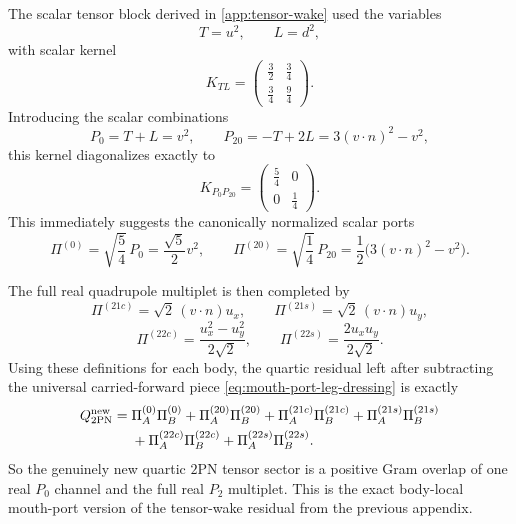 \documentclass[11pt]{article}
\newcommand{\TwoPN}{\mathrm{2PN}}
\begin{document}
The scalar tensor block derived in \cref{app:tensor-wake} used the variables
\begin{equation}
T=u^2,
\qquad
L=d^2,
\label{eq:mouth-port-TL}
\end{equation}
with scalar kernel
\begin{equation}
K_{TL}=
\begin{pmatrix}
\frac32 & \frac34\\[3pt]
\frac34 & \frac94
\end{pmatrix}.
\label{eq:mouth-port-KTL}
\end{equation}
Introducing the scalar combinations
\begin{equation}
P_0=T+L=v^2,
\qquad
P_{20}=-T+2L=3(v\!\cdot\!n)^2-v^2,
\label{eq:mouth-port-P0P20}
\end{equation}
this kernel diagonalizes exactly to
\begin{equation}
K_{P_0P_{20}}=
\begin{pmatrix}
\frac54 & 0\\[3pt]
0 & \frac14
\end{pmatrix}.
\label{eq:mouth-port-Kdiag}
\end{equation}
This immediately suggests the canonically normalized scalar ports
\begin{equation}
\Pi^{(0)}=\sqrt{\frac54}\,P_0=\frac{\sqrt5}{2}v^2,
\qquad
\Pi^{(20)}=\sqrt{\frac14}\,P_{20}=\frac12\bigl(3(v\!\cdot\!n)^2-v^2\bigr).
\label{eq:mouth-port-scalar-ports}
\end{equation}

The full real quadrupole multiplet is then completed by
\begin{equation}
\Pi^{(21c)}=\sqrt2\,(v\!\cdot\!n)u_x,
\qquad
\Pi^{(21s)}=\sqrt2\,(v\!\cdot\!n)u_y,
\label{eq:mouth-port-21-ports}
\end{equation}
\begin{equation}
\Pi^{(22c)}=\frac{u_x^2-u_y^2}{2\sqrt2},
\qquad
\Pi^{(22s)}=\frac{2u_xu_y}{2\sqrt2}.
\label{eq:mouth-port-22-ports}
\end{equation}
Using these definitions for each body, the quartic residual left after subtracting the
universal carried-forward piece \cref{eq:mouth-port-leg-dressing} is exactly
\begin{align}
Q^{\rm new}_{2\mathrm{PN}}
={}&
\Pi_A^{(0)}\Pi_B^{(0)}
+\Pi_A^{(20)}\Pi_B^{(20)}
+\Pi_A^{(21c)}\Pi_B^{(21c)}
+\Pi_A^{(21s)}\Pi_B^{(21s)}
\notag\\
&
+\Pi_A^{(22c)}\Pi_B^{(22c)}
+\Pi_A^{(22s)}\Pi_B^{(22s)}.
\label{eq:mouth-port-quartic-residual}
\end{align}
So the genuinely new quartic \(\TwoPN\) tensor sector is a positive Gram overlap of one
real \(P_0\) channel and the full real \(P_2\) multiplet.  This is the exact
body-local mouth-port version of the tensor-wake residual from the previous appendix.
\end{document}
